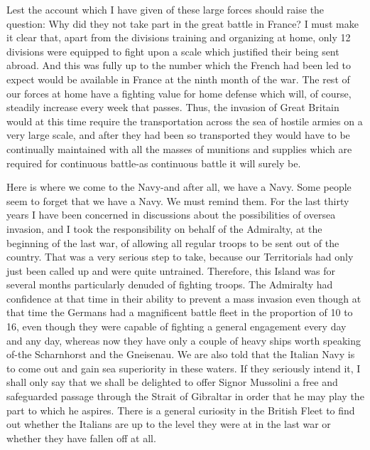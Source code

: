 \documentclass[a4paper]{amsbook}
\begin{document}
Lest the account which I have given of these large forces should raise the question: Why did they not take part in the great battle in France? I must make it clear that, apart from the divisions training and organizing at home, only 12 divisions were equipped to fight upon a scale which justified their being sent abroad. And this was fully up to the number which the French had been led to expect would be available in France at the ninth month of the war. The rest of our forces at home have a fighting value for home defense which will, of course, steadily increase every week that passes. Thus, the invasion of Great Britain would at this time require the transportation across the sea of hostile armies on a very large scale, and after they had been so transported they would have to be continually maintained with all the masses of munitions and supplies which are required for continuous battle-as continuous battle it will surely be.

Here is where we come to the Navy-and after all, we have a Navy. Some people seem to forget that we have a Navy. We must remind them. For the last thirty years I have been concerned in discussions about the possibilities of oversea invasion, and I took the responsibility on behalf of the Admiralty, at the beginning of the last war, of allowing all regular troops to be sent out of the country. That was a very serious step to take, because our Territorials had only just been called up and were quite untrained. Therefore, this Island was for several months particularly denuded of fighting troops. The Admiralty had confidence at that time in their ability to prevent a mass invasion even though at that time the Germans had a magnificent battle fleet in the proportion of 10 to 16, even though they were capable of fighting a general engagement every day and any day, whereas now they have only a couple of heavy ships worth speaking of-the Scharnhorst and the Gneisenau. We are also told that the Italian Navy is to come out and gain sea superiority in these waters. If they seriously intend it, I shall only say that we shall be delighted to offer Signor Mussolini a free and safeguarded passage through the Strait of Gibraltar in order that he may play the part to which he aspires. There is a general curiosity in the British Fleet to find out whether the Italians are up to the level they were at in the last war or whether they have fallen off at all.
\end{document}

